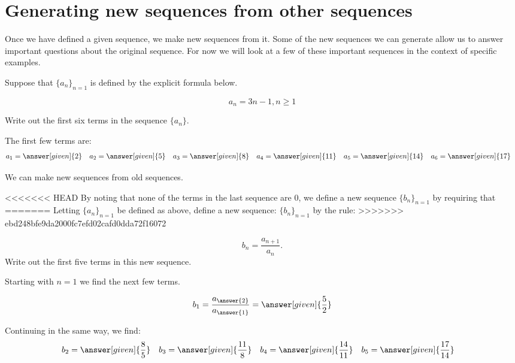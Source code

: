 \documentclass{ximera}
\begin{document}
\section{Generating new sequences from other sequences}


Once we have defined a given sequence, we make new sequences from it.  Some of the new sequences we can generate allow us to answer important questions about the original sequence.  For now we will look at a few of these important sequences in the context of specific examples. 

\begin{example}
Suppose that $\{a_n\}_{n=1}$ is defined by the explicit formula below.

\[
a_n = 3n-1, n \geq 1
\]

Write out the first six terms in the sequence $\{a_n\}$.
\begin{explanation}
  The first few terms are:
    \begin{align*}
      a_1 &= \answer[given]{2} & 
      a_2 &= \answer[given]{5} & 
      a_3 &= \answer[given]{8} & 
      a_4 &= \answer[given]{11} & 
      a_5 &= \answer[given]{14}  & 
      a_6 &= \answer[given]{17} 
    \end{align*}
\end{explanation}
\end{example}

We can make new sequences from old sequences.

\begin{example}
<<<<<<< HEAD
By noting that none of the terms in the last sequence are 0, we define a new sequence $\{b_n\}_{n=1}$ by requiring that
=======
Letting $\{a_n\}_{n=1}$ be defined as above, define a new sequence:
$\{b_n\}_{n=1}$ by the rule:
>>>>>>> ebd248bfe9da2000fc7efd02cafd0dda72f16072

\[
b_n = \frac{a_{n+1}}{a_n}. 
\]
Write out the first five terms in this new sequence.

\begin{explanation}
Starting with $n=1$ we find the next few terms.

\[      b_1 = \frac{a_{\answer{2}}}{a_{\answer{1}}} = \answer[given]{\frac{5}{2}}       \]
      
Continuing in the same way, we find:     
     \begin{align*}
      	b_2 &=  \answer[given]{\frac{8}{5}}  & 
	b_3 &= \answer[given]{\frac{11}{8}}  & 
	b_4 &= \answer[given]{\frac{14}{11}}  & 
	b_5 &=  \answer[given]{\frac{17}{14}}  & 
    \end{align*}
    
\end{explanation}
    
\end{example}
\end{document}
